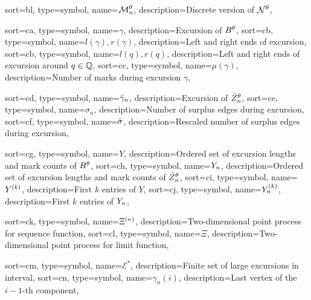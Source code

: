 {
	sort={bl},
	type=symbol,
name={$\mathcal{M}_n^{\theta}$},
description={Discrete version of $\mathcal{N}^{\theta}$, \pageref{D: Ndis}}
}






{
	sort={ca},
	type=symbol,
	name={$\gamma$},
	description={Excursion of $B^{\theta}$, \pageref{I: gamma}}
}
{
	sort={cb},
	type=symbol,
name={$l(\gamma), r(\gamma)$},
description={Left and right ends of excursion, \pageref{I: rgammalgamma}}
}
{
sort={cb},
type=symbol,
name={$l(q), r(q)$},
description={Left and right ends of excursion around $q \in \mathbb{Q}$, \pageref{E: def l(q)}}
}
{
	sort={cc},
	type=symbol,
name={$\mu(\gamma)$},
description={Number of marks during excursion $\gamma$, \pageref{I: mugamma}}
}

{
	sort={cd},
	type=symbol,
name={$\bar{\gamma}_n$},
description={Excursion of $\bar{Z}^{\theta}_n$, \pageref{L: sum rgamman}}
}
{
	sort={ce},
	type=symbol,
name={$\sigma_n$},
description={Number of surplus edges during excursion, \pageref{T: Main}}
}
{
	sort={cf},
	type=symbol,
name={$\bar{\sigma}$},
description={Rescaled number of surplus edges during excursion, \pageref{E: def Yn}}
}

{
	sort={cg},
	type=symbol,
name={$Y$},
description={Ordered set of excursion lengths and mark counts of $B^{\theta}$, \pageref{E: def Y}}
}
{
	sort={ch},
	type=symbol,
name={$Y_n$},
description={Ordered set of excursion lengths and mark counts of $\bar{Z}^{\theta}_n$, \pageref{E: def Yn}}
}
{
	sort={ci},
	type=symbol,
name={$Y^{(k)}$},
description={First $k$ entries of $Y$, \pageref{E: def Yk Ynk}}
}
{
	sort={cj},
	type=symbol,
name={$Y_n^{(k)}$},
description={First $k$ entries of $Y_n$, \pageref{E: def Yk Ynk}}
}

{
	sort={ck},
	type=symbol,
	name={$\Xi^{(n)}$},
	description={Two-dimensional point process for sequence function, \pageref{L: Deterministic Lemma}}
}
{
	sort={cl},
	type=symbol,
name={$\Xi$},
description={Two-dimensional point process for limit function, \pageref{L: Deterministic Lemma}}
}

{
	sort={cm},
	type=symbol,
	name={$\mathcal{E}^*$},
	description={Finite set of large excursions in interval, \pageref{L: Deterministic Lemma}}
}
{
	sort={cn},
	type=symbol,
name={$\gamma_n(i)$},
description={Last vertex of the $i-1$-th component, \pageref{L: Lemma 8}}
}


